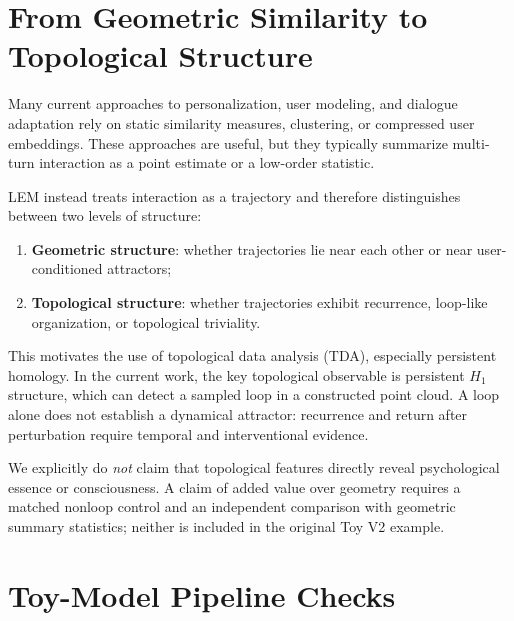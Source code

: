 \documentclass[11pt]{article}
\begin{document}

\section{From Geometric Similarity to Topological Structure}

Many current approaches to personalization, user modeling, and dialogue adaptation
rely on static similarity measures, clustering, or compressed user embeddings.
These approaches are useful, but they typically summarize multi-turn interaction as
a point estimate or a low-order statistic.

LEM instead treats interaction as a trajectory and therefore distinguishes between
two levels of structure:

\begin{enumerate}[leftmargin=1.8em]
  \item \textbf{Geometric structure}: whether trajectories lie near each other or
        near user-conditioned attractors;
  \item \textbf{Topological structure}: whether trajectories exhibit recurrence,
        loop-like organization, or topological triviality.
\end{enumerate}

This motivates the use of topological data analysis (TDA), especially persistent
homology. In the current work, the key topological observable is persistent $H_1$
structure, which can detect a sampled loop in a constructed point cloud. A
loop alone does not establish a dynamical attractor: recurrence and return
after perturbation require temporal and interventional evidence.

We explicitly do \emph{not} claim that topological features directly reveal
psychological essence or consciousness. A claim of added value over geometry
requires a matched nonloop control and an independent comparison with geometric
summary statistics; neither is included in the original Toy V2 example.


\section{Toy-Model Pipeline Checks}
\end{document}
